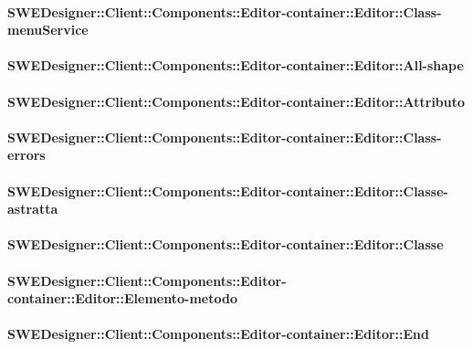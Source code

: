 			\paragraph{SWEDesigner::Client::Components::Editor-container::Editor::Class-menuService}
				
				
			\paragraph{SWEDesigner::Client::Components::Editor-container::Editor::All-shape}
				
				
			\paragraph{SWEDesigner::Client::Components::Editor-container::Editor::Attributo}
				
				
			\paragraph{SWEDesigner::Client::Components::Editor-container::Editor::Class-errors}
				
				
			\paragraph{SWEDesigner::Client::Components::Editor-container::Editor::Classe-astratta}
				
				
			\paragraph{SWEDesigner::Client::Components::Editor-container::Editor::Classe}
				
				
			\paragraph{SWEDesigner::Client::Components::Editor-container::Editor::Elemento-metodo}
				
				
			\paragraph{SWEDesigner::Client::Components::Editor-container::Editor::End}
				
				
